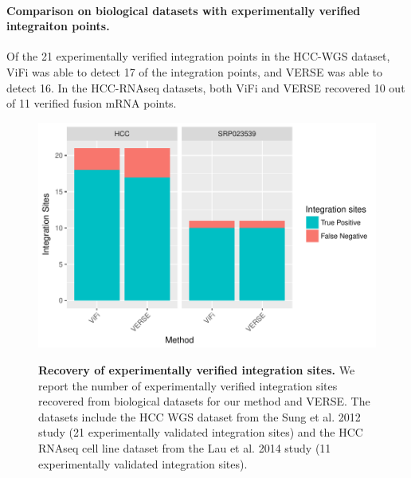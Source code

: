 \documentclass[10pt]{article}
\begin{document}
\paragraph{\textbf{Comparison on biological datasets with experimentally verified integraiton points.}}  
Of the 21 experimentally verified integration points in the HCC-WGS dataset, ViFi was able to detect 17 of the integration points, and VERSE was able to detect 16.  In the HCC-RNAseq datasets, both ViFi and VERSE recovered 10 out of 11 verified fusion mRNA points.

\begin{figure}[htpb]
  \centering
  \includegraphics[width=1\linewidth]{results/hcc.pdf}\\
\caption[Recovery of experimentally verified integration sites from biological datasets.]
{\label{bio_results}  {\bf Recovery of experimentally verified integration sites.}  We report the number of experimentally verified integration sites recovered from biological datasets for our method and VERSE.  The datasets include the HCC WGS dataset from the Sung et al. 2012 study (21 experimentally validated integration sites) and the HCC RNAseq cell line dataset from the Lau et al. 2014 study (11 experimentally validated integration sites).}
\end{figure}
\end{document}
